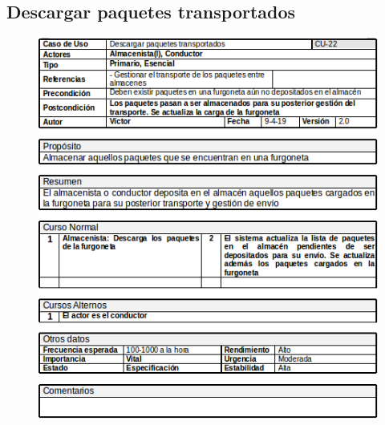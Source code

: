 \subsection{Descargar paquetes transportados}
\begin{figure}[H]
	\centering
	\includegraphics[width=16cm]{22}
\end{figure}
